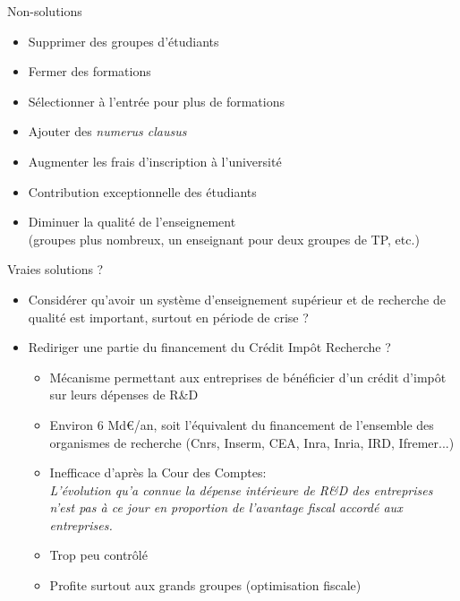 \documentclass[10pt,final,usepdftitle=false]{beamer}
\begin{document}
\begin{frame}{Non-solutions}
\begin{itemize}
\item Supprimer des groupes d'étudiants
\item Fermer des formations
\item Sélectionner à l'entrée pour plus de formations
\item Ajouter des \textsl{numerus clausus}
\item Augmenter les frais d'inscription à l'université
\item Contribution exceptionnelle des étudiants
\item Diminuer la qualité de l'enseignement\\ {\small (groupes plus nombreux, un enseignant pour deux groupes de TP, etc.)}
\end{itemize}
\end{frame}

\begin{frame}{Vraies solutions ?}
\begin{itemize}
\item Considérer qu'avoir un système d'enseignement supérieur et de recherche de 
qualité est important, surtout en période de crise ?
\pause
\item Rediriger une partie du financement du Crédit Impôt Recherche ?
\begin{itemize}
\item Mécanisme permettant aux entreprises de bénéficier d'un crédit d'impôt sur leurs dépenses de R\&D
\item Environ 6 Md\euro/an, soit l'équivalent du financement de l'ensemble des 
organismes de recherche (Cnrs, Inserm, CEA, Inra, Inria, IRD, Ifremer...)
\item Inefficace d'après la Cour des Comptes:\\
	{\sl \og L’évolution qu’a connue la dépense intérieure de R\&D des entreprises n’est pas à ce jour en proportion de l’avantage fiscal accordé aux entreprises. \fg }
\item Trop peu contrôlé
\item Profite surtout aux grands groupes (optimisation fiscale)
\end{itemize}
\end{itemize}
\end{frame}
\end{document}

